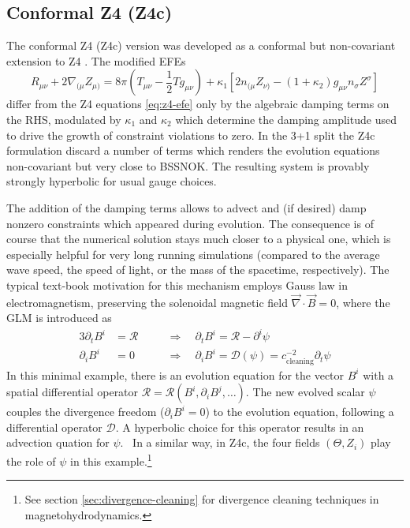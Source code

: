 \subsection[Z4c]{Conformal Z4 (Z4c)}
The conformal Z4 (Z4c) version was developed as a conformal but non-covariant
extension to Z4 \cite{Bernuzzi:2009ex,Cao:2012,Ruiz:2010qj,Weyhausen:2011cg,Hilditch2012}.
The modified EFEs
\begin{equation}\label{eq:Z4c}
R_{\mu\nu} + 2\nabla_{(\mu} Z_{\mu)}
=
8\pi (T_{\mu\nu} - \frac 12 T g_{\mu\nu})
+ \kappa_1 \left[ 2 n_{(\mu} Z_{\nu)} - (1 + \kappa_2) g_{\mu\nu} n_\sigma Z^\sigma \right]
\end{equation}
differ from the Z4 equations \eqref{eq:z4-efe} only by the algebraic damping
terms on the RHS, modulated by $\kappa_1$ and $\kappa_2$ which determine the damping
amplitude used to drive the growth of constraint violations to zero.
In the 3+1 split the Z4c formulation discard a number of terms which renders the
evolution equations non-covariant but very close to BSSNOK.
The resulting system is provably strongly hyperbolic for usual gauge choices.

The addition of the damping terms allows to advect and (if desired) damp
nonzero constraints which appeared during evolution. The consequence is of
course that the numerical solution stays much closer to a physical one, which is
especially helpful for very long running simulations (compared to the average
wave speed, \ie the speed of light, or the  mass of the spacetime, respectively).
The typical text-book motivation for this
mechanism employs Gauss law in electromagnetism, \ie preserving the solenoidal magnetic
field $\vec \nabla \cdot \vec B=0$, where the GLM is introduced as \cite{Dedner:2002}
\begin{alignat}{3}
\partial_t B^i &= \mathcal  R
&&\quad\Rightarrow\quad  \partial_t B^i = \mathcal R - \partial^i \psi \\
\partial_i B^i &= 0
&&\quad\Rightarrow\quad  \partial_i B^i = \mathcal  D(\psi) = 
c_\text{cleaning}^{-2} \partial_t \psi
\end{alignat}
In this minimal example, there is an evolution equation for the vector $B^i$ 
with a
spatial differential operator $\mathcal R = \mathcal R(B^i, \partial_i B^j, 
\dots)$.
The new evolved scalar $\psi$ couples the divergence freedom ($\partial_i 
B^i=0$)
to the evolution equation, following a differential operator $\mathcal D$. A 
hyperbolic
choice for this operator results in an advection quation for $\psi$.
~In a similar way, in Z4c, the four fields $(\Theta,Z_i)$ play the role of $\psi$
in this example.\footnote{
  See section \ref{sec:divergence-cleaning} for divergence cleaning
  techniques in magnetohydrodynamics.
}

